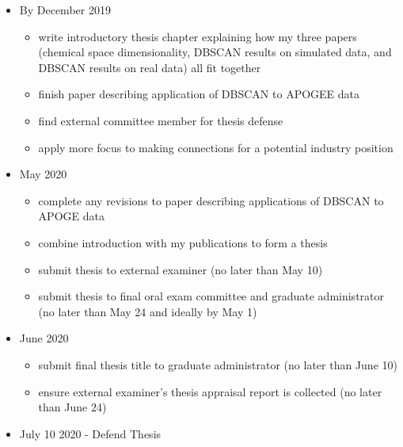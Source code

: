 \documentclass[11pt]{article}
\begin{document}
\begin{itemize}

\item By December 2019
\begin{itemize}
\item {\color{ForestGreen} write introductory thesis chapter explaining how my three papers (chemical space dimensionality, DBSCAN results on simulated data, and DBSCAN results on real data) all fit together}
\item {\color{RoyalBlue}finish paper describing application of DBSCAN to APOGEE data}
\item {\color{RoyalBlue} find external committee member for thesis defense}
\item {\color{ForestGreen} apply more focus to making connections for a potential industry position}
\end{itemize}
\item May 2020
\begin{itemize}
\item {complete any revisions to paper describing applications of DBSCAN to APOGE data}
\item {\color{ForestGreen} combine introduction with my publications to form a thesis}
\item {submit thesis to external examiner (no later than May 10)}
\item submit thesis to final oral exam committee and graduate administrator (no later than May 24 and ideally by May 1)
\end{itemize}
\item June 2020
\begin{itemize}
\item submit final thesis title to graduate administrator (no later than June 10)
\item ensure external examiner's thesis appraisal report is collected (no later than June 24) 
\end{itemize}
\item July 10 2020 - Defend Thesis
\end{itemize}



\end{document}

